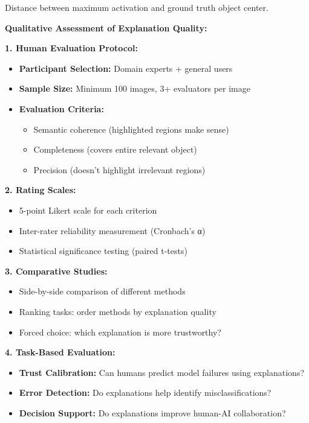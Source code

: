 \documentclass[12pt]{article}
\begin{document}
\begin{enumerate}[(a)]
{    Distance between maximum activation and ground truth object center.
    
    \textbf{Qualitative Assessment of Explanation Quality:}
    
    \textbf{1. Human Evaluation Protocol:}
    \begin{itemize}
        \item \textbf{Participant Selection:} Domain experts + general users
        \item \textbf{Sample Size:} Minimum 100 images, 3+ evaluators per image
        \item \textbf{Evaluation Criteria:}
        \begin{itemize}
            \item Semantic coherence (highlighted regions make sense)
            \item Completeness (covers entire relevant object)
            \item Precision (doesn't highlight irrelevant regions)
        \end{itemize}
    \end{itemize}
    
    \textbf{2. Rating Scales:}
    \begin{itemize}
        \item 5-point Likert scale for each criterion
        \item Inter-rater reliability measurement (Cronbach's α)
        \item Statistical significance testing (paired t-tests)
    \end{itemize}
    
    \textbf{3. Comparative Studies:}
    \begin{itemize}
        \item Side-by-side comparison of different methods
        \item Ranking tasks: order methods by explanation quality
        \item Forced choice: which explanation is more trustworthy?
    \end{itemize}
    
    \textbf{4. Task-Based Evaluation:}
    \begin{itemize}
        \item \textbf{Trust Calibration:} Can humans predict model failures using explanations?
        \item \textbf{Error Detection:} Do explanations help identify misclassifications?
        \item \textbf{Decision Support:} Do explanations improve human-AI collaboration?
    \end{itemize}
    
}
\end{enumerate}
\end{document}
